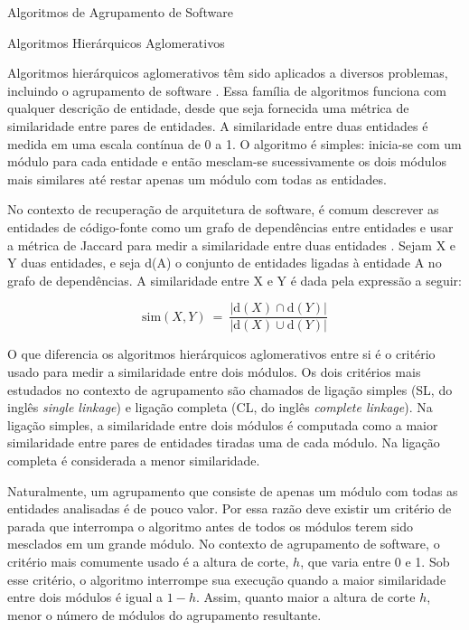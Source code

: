 \begin{section}{Algoritmos de Agrupamento de Software}
\begin{subsection}{Algoritmos Hierárquicos Aglomerativos}

Algoritmos hierárquicos aglomerativos têm sido aplicados a diversos problemas, incluindo o agrupamento de software \cite{Anquetil1999,Maqbool2007}. Essa família de algoritmos funciona com qualquer descrição de entidade, desde que seja fornecida uma métrica de similaridade entre pares de entidades. A similaridade entre duas entidades é medida em uma escala contínua de 0 a 1. O algoritmo é simples: inicia-se com um módulo para cada entidade e então mesclam-se sucessivamente os dois módulos mais similares até restar apenas um módulo com todas as entidades.

No contexto de recuperação de arquitetura de software, é comum descrever as entidades de código-fonte como um grafo de dependências entre entidades e usar a métrica de Jaccard para medir a similaridade entre duas entidades \cite{Anquetil1999}. Sejam X e Y duas entidades, e seja d(A) o conjunto de entidades ligadas à entidade A no grafo de dependências. A similaridade entre X e Y é dada pela expressão a seguir:

$$
\mathrm{sim}(X, Y) ~=~ \frac{|\mathrm{d}(X) \cap \mathrm{d}(Y)|}{|\mathrm{d}(X) \cup \mathrm{d}(Y)|}
$$

O que diferencia os algoritmos hierárquicos aglomerativos entre si é o critério usado para medir a similaridade entre dois módulos. Os dois critérios mais estudados no contexto de agrupamento são chamados de ligação simples (SL, do inglês \emph{single linkage}) e ligação completa (CL, do inglês \emph{complete linkage}). Na ligação simples, a similaridade entre dois módulos é computada como a maior similaridade entre pares de entidades tiradas uma de cada módulo. Na ligação completa é considerada a menor similaridade.

Naturalmente, um agrupamento que consiste de apenas um módulo com todas as entidades analisadas é de pouco valor. Por essa razão deve existir um critério de parada que interrompa o algoritmo antes de todos os módulos terem sido mesclados em um grande módulo. No contexto de agrupamento de software, o critério mais comumente usado é a altura de corte, $h$, que varia entre 0 e 1. Sob esse critério, o algoritmo interrompe sua execução quando a maior similaridade entre dois módulos é igual a $1 - h$. Assim, quanto maior a altura de corte $h$, menor o número de módulos do agrupamento resultante.
	
\end{subsection}


\end{section}

